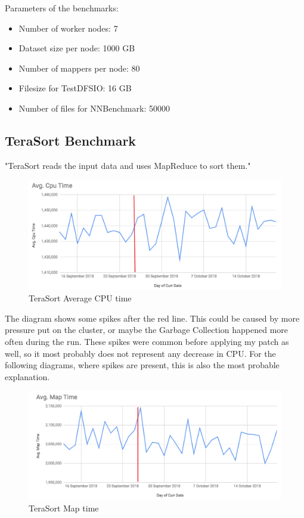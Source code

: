 \noindent Parameters of the benchmarks: 
\begin{itemize}
	\setlength{\itemsep}{1pt}
	\item Number of worker nodes: 7
	\item Dataset size per node: 1000 GB
	\item Number of mappers per node: 80
	\item Filesize for TestDFSIO: 16 GB
	\item Number of files for NNBenchmark: 50000
\end{itemize}

\subsection{TeraSort Benchmark}
"TeraSort reads the input data and uses MapReduce to sort them." \cite{terasort}

\begin{figure}[H]
	\includegraphics[width=125mm, keepaspectratio]{figures/terasort_cpu.png}
	\centering
	\caption{TeraSort Average CPU time}
\end{figure}

The diagram shows some spikes after the red line. This could be caused by more pressure put on the cluster, or maybe the Garbage Collection happened more often during the run. These spikes were common before applying my patch as well, so it most probably does not represent any decrease in CPU. For the following diagrams, where spikes are present, this is also the most probable explanation.

\begin{figure}[H]
	\includegraphics[width=125mm, keepaspectratio]{figures/terasort_map.png}
	\centering
	\caption{TeraSort Map time}
\end{figure}

